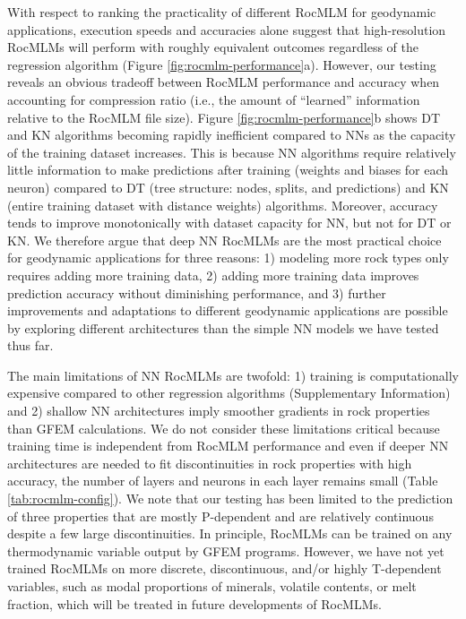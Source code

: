 \documentclass[draft,linenumbers]{agujournal2018}
\begin{document}
With respect to ranking the practicality of different RocMLM for geodynamic applications, execution speeds and accuracies alone suggest that high-resolution RocMLMs will perform with roughly equivalent outcomes regardless of the regression algorithm (Figure \ref{fig:rocmlm-performance}a). However, our testing reveals an obvious tradeoff between RocMLM performance and accuracy when accounting for compression ratio (i.e., the amount of ``learned'' information relative to the RocMLM file size). Figure \ref{fig:rocmlm-performance}b shows DT and KN algorithms becoming rapidly inefficient compared to NNs as the capacity of the training dataset increases. This is because NN algorithms require relatively little information to make predictions after training (weights and biases for each neuron) compared to DT (tree structure: nodes, splits, and predictions) and KN (entire training dataset with distance weights) algorithms. Moreover, accuracy tends to improve monotonically with dataset capacity for NN, but not for DT or KN. We therefore argue that deep NN RocMLMs are the most practical choice for geodynamic applications for three reasons: 1) modeling more rock types only requires adding more training data, 2) adding more training data improves prediction accuracy without diminishing performance, and 3) further improvements and adaptations to different geodynamic applications are possible by exploring different architectures than the simple NN models we have tested thus far.

The main limitations of NN RocMLMs are twofold: 1) training is computationally expensive compared to other regression algorithms (Supplementary Information) and 2) shallow NN architectures imply smoother gradients in rock properties than GFEM calculations. We do not consider these limitations critical because training time is independent from RocMLM performance and even if deeper NN architectures are needed to fit discontinuities in rock properties with high accuracy, the number of layers and neurons in each layer remains small (Table \ref{tab:rocmlm-config}). We note that our testing has been limited to the prediction of three properties that are mostly P-dependent and are relatively continuous despite a few large discontinuities. In principle, RocMLMs can be trained on any thermodynamic variable output by GFEM programs. However, we have not yet trained RocMLMs on more discrete, discontinuous, and/or highly T-dependent variables, such as modal proportions of minerals, volatile contents, or melt fraction, which will be treated in future developments of RocMLMs.
\end{document}
